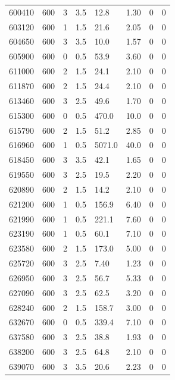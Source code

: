 \documentclass[preview]{standalone}
\begin{document}
{{{{{{\begin{tabular}{L{1.2cm}C{1.2cm} C{0.3cm}C{0.5cm} C{1.4cm}C{1.4cm} C{1.4cm}C{1.4cm}}
  600410  &   600  & 3     & 3.5 &  12.8  & 1.30  & 0 &  0   \\ 
  603120  &   600  & 1     & 1.5 &  21.6  & 2.05  & 0 &  0   \\ 
  604650  &   600  & 3     & 3.5 &  10.0  & 1.57  & 0 &  0   \\ 
  605900  &   600  & 0     & 0.5 &  53.9  & 3.60  & 0 &  0   \\ 
  611000  &   600  & 2     & 1.5 &  24.1  & 2.10  & 0 &  0   \\ 
  611870  &   600  & 2     & 1.5 &  24.4  & 2.10  & 0 &  0   \\ 
  613460  &   600  & 3     & 2.5 &  49.6  & 1.70  & 0 &  0   \\ 
  615300  &   600  & 0     & 0.5 &  470.0  & 10.0  & 0 &  0   \\ 
  615790  &   600  & 2     & 1.5 &  51.2  & 2.85  & 0 &  0   \\ 
  616960  &   600  & 1     & 0.5 &  5071.0  & 40.0  & 0 &  0   \\ 
  618450  &   600  & 3     & 3.5 &  42.1  & 1.65  & 0 &  0   \\ 
  619550  &   600  & 3     & 2.5 &  19.5  & 2.20  & 0 &  0   \\ 
  620890  &   600  & 2     & 1.5 &  14.2  & 2.10  & 0 &  0   \\ 
  621200  &   600  & 1     & 0.5 &  156.9  & 6.40  & 0 &  0   \\ 
  621990  &   600  & 1     & 0.5 &  221.1  & 7.60  & 0 &  0   \\ 
  623190  &   600  & 1     & 0.5 &  60.1  & 7.10  & 0 &  0   \\ 
  623580  &   600  & 2     & 1.5 &  173.0  & 5.00  & 0 &  0   \\ 
  625720  &   600  & 3     & 2.5 &  7.40  & 1.23  & 0 &  0   \\ 
  626950  &   600  & 3     & 2.5 &  56.7  & 5.33  & 0 &  0   \\ 
  627090  &   600  & 3     & 2.5 &  62.5  & 3.20  & 0 &  0   \\ 
  628240  &   600  & 2     & 1.5 &  158.7  & 3.00  & 0 &  0   \\ 
  632670  &   600  & 0     & 0.5 &  339.4  & 7.10  & 0 &  0   \\ 
  637580  &   600  & 3     & 2.5 &  38.8  & 1.93  & 0 &  0   \\ 
  638200  &   600  & 3     & 2.5 &  64.8  & 2.10  & 0 &  0   \\ 
  639070  &   600  & 3     & 3.5 &  20.6  & 2.23  & 0 &  0   \\ 
\hline 
\end{tabular} 

}}}}}}
\end{document}
